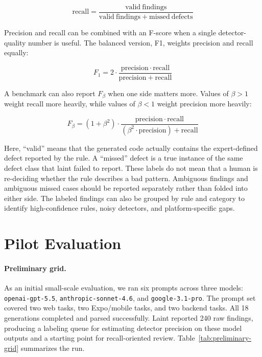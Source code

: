 \documentclass[11pt]{article}
\begin{document}
\[
\mathrm{recall} = \frac{\mathrm{valid\ findings}}{\mathrm{valid\ findings} + \mathrm{missed\ defects}}
\]

Precision and recall can be combined with an F-score when a single detector-quality number is useful. The balanced version, F1, weights precision and recall equally:

\[
F_1 = 2 \cdot \frac{\mathrm{precision} \cdot \mathrm{recall}}{\mathrm{precision} + \mathrm{recall}}
\]

A benchmark can also report \(F_\beta\) when one side matters more. Values of \(\beta > 1\) weight recall more heavily, while values of \(\beta < 1\) weight precision more heavily:

\[
F_\beta = (1 + \beta^2) \cdot \frac{\mathrm{precision} \cdot \mathrm{recall}}{(\beta^2 \cdot \mathrm{precision}) + \mathrm{recall}}
\]

Here, ``valid'' means that the generated code actually contains the expert-defined defect reported by the rule. A ``missed'' defect is a true instance of the same defect class that laint failed to report. These labels do not mean that a human is re-deciding whether the rule describes a bad pattern. Ambiguous findings and ambiguous missed cases should be reported separately rather than folded into either side. The labeled findings can also be grouped by rule and category to identify high-confidence rules, noisy detectors, and platform-specific gaps.

\section{Pilot Evaluation}

\paragraph{Preliminary grid.}
As an initial small-scale evaluation, we ran six prompts across three models: \texttt{openai-gpt-5.5}, \texttt{anthropic-sonnet-4.6}, and \texttt{google-3.1-pro}. The prompt set covered two web tasks, two Expo/mobile tasks, and two backend tasks. All 18 generations completed and parsed successfully. Laint reported 240 raw findings, producing a labeling queue for estimating detector precision on these model outputs and a starting point for recall-oriented review. Table~\ref{tab:preliminary-grid} summarizes the run.
\end{document}
